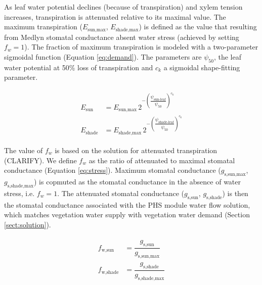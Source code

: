 \documentclass[draft,linenumbers]{agujournal}
\begin{document}
     As leaf water potential declines (because of transpiration) and xylem tension increases, transpiration is attenuated relative to its maximal value.
     The maximum transpiration ($E_{\text{sun,max}}$, $E_{\text{shade,max}}$) is defined as the value that resulting from Medlyn stomatal conductance absent water stress (achieved by setting $f_w=1$).
     The fraction of maximum transpiration is modeled with a two-parameter sigmoidal function (Equation \ref{eq:demand}). 
     The parameters are $\psi_{50}$, the leaf water potential at 50\% loss of transpiration and 
     $c_k$ a sigmoidal shape-fitting parameter.

     \begin{linenomath*}
     \begin{eqnarray}
     \begin{aligned}
     \label{eq:demand}
     E_{\text{sun}}     &= E_{\text{sun,max}} \, 2^{-\left(\dfrac{\psi_{\text{sun-leaf}}}{\psi_{50}}\right)^{c_k}} \\
     E_{\text{shade}} &= E_{\text{shade,max}} \, 2^{-\left(\dfrac{\psi_{\text{shade-leaf}}}{\psi_{50}}\right)^{c_k}}
     \end{aligned}
     \end{eqnarray}
     \end{linenomath*}
    
    The value of $f_w$ is based on the solution for attenuated transpiration (CLARIFY).
    We define $f_w$ as the ratio of attenuated to maximal stomatal conductance (Equation \ref{eq:stress}).
    Maximum stomatal conductance ($g_{\text{s,sun,max}}$, $g_{\text{s,shade,max}}$) is copmuted as the stomatal conductance in the absence of water stress, i.e. $f_w=1$.
    The attenuated stomatal conductance ($g_{\text{s,sun}}$, $g_{\text{s,shade}}$) is then the stomatal conductance associated with the PHS module
    water flow solution, which matches vegetation water supply with vegetation water demand 
    (Section \ref{sect:solution}).
    
     \begin{linenomath*}
     \begin{eqnarray}
     \begin{aligned}
     \label{eq:stress}
     f_{\text{w,sun}}         &= \dfrac{g_{\text{s,sun}}}{g_{\text{s,sun,max}}} \\
     f_{\text{w,shade}}     &= \dfrac{g_{\text{s,shade}}}{g_{\text{s,shade,max}}} \\
     \end{aligned}
     \end{eqnarray}
     \end{linenomath*}
    
\end{document}

